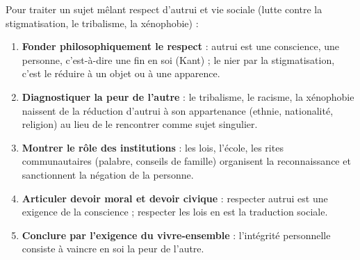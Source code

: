 \documentclass[11pt]{article}
\begin{document}
\begin{methode}
Pour traiter un sujet mêlant respect d'autrui et vie sociale (lutte contre la stigmatisation, le tribalisme, la xénophobie) :
\begin{enumerate}
\item \textbf{Fonder philosophiquement le respect} : autrui est une conscience, une personne, c'est-à-dire une fin en soi (Kant) ; le nier par la stigmatisation, c'est le réduire à un objet ou à une apparence.
\item \textbf{Diagnostiquer la peur de l'autre} : le tribalisme, le racisme, la xénophobie naissent de la réduction d'autrui à son appartenance (ethnie, nationalité, religion) au lieu de le rencontrer comme sujet singulier.
\item \textbf{Montrer le rôle des institutions} : les lois, l'école, les rites communautaires (palabre, conseils de famille) organisent la reconnaissance et sanctionnent la négation de la personne.
\item \textbf{Articuler devoir moral et devoir civique} : respecter autrui est une exigence de la conscience ; respecter les lois en est la traduction sociale.
\item \textbf{Conclure par l'exigence du vivre-ensemble} : l'intégrité personnelle consiste à vaincre en soi la peur de l'autre.
\end{enumerate}
\end{methode}
\end{document}
